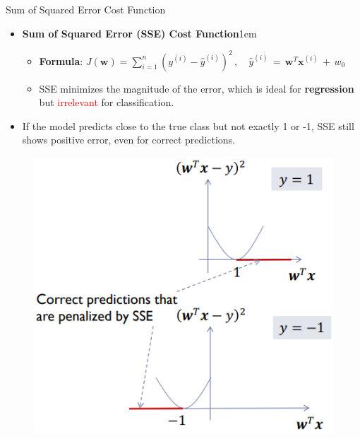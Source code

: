 \documentclass[serif, aspectratio=169]{beamer}
\begin{document}
\begin{frame}{Sum of Squared Error Cost Function}
    \begin{itemize}
        \item \textbf{Sum of Squared Error (SSE) Cost Function}\itemsep1em
        \medskip
        \begin{itemize}\itemsep0.8em
            \item \textbf{Formula}:
                \(
                J(\mathbf{w}) = \sum_{i=1}^{n} (y^{(i)} - \hat{y}^{(i)})^2 \, , \quad \hat{y}^{(i)} \, = \, \mathbf{w}^T\mathbf{x}^{(i)} \, + \, w_0
                \)
            \item \justifying SSE minimizes the magnitude of the error, which is ideal for \textbf{regression} but \textcolor{red}{irrelevant} for classification.
        \end{itemize}
    \end{itemize}
    \begin{itemize}
        \item \justifying If the model predicts close to the true class but not exactly 1 or -1, SSE still shows positive error, even for correct predictions.
    \end{itemize}
    \endminipage
        \begin{figure}
            \centering
            \includegraphics[width=.8\linewidth]{pic/Figure_11.png}
        \end{figure}
    \endminipage
\end{frame}
\end{document}
